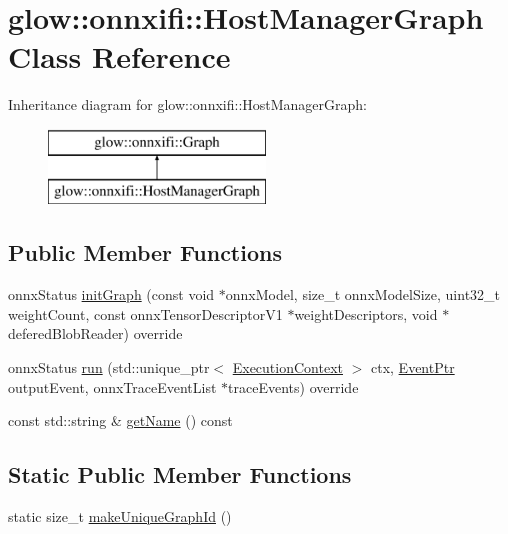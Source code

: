 \hypertarget{classglow_1_1onnxifi_1_1_host_manager_graph}{}\section{glow\+:\+:onnxifi\+:\+:Host\+Manager\+Graph Class Reference}
\label{classglow_1_1onnxifi_1_1_host_manager_graph}
Inheritance diagram for glow\+:\+:onnxifi\+:\+:Host\+Manager\+Graph\+:\begin{figure}[H]
\begin{center}
\leavevmode
\includegraphics[height=2.000000cm]{classglow_1_1onnxifi_1_1_host_manager_graph}
\end{center}
\end{figure}
\subsection*{Public Member Functions}
\begin{DoxyCompactItemize}
\item 
onnx\+Status \hyperlink{classglow_1_1onnxifi_1_1_host_manager_graph_a58234ef078e7db198825b214881fe7ef}{init\+Graph} (const void $\ast$onnx\+Model, size\+\_\+t onnx\+Model\+Size, uint32\+\_\+t weight\+Count, const onnx\+Tensor\+Descriptor\+V1 $\ast$weight\+Descriptors, void $\ast$defered\+Blob\+Reader) override
\item 
onnx\+Status \hyperlink{classglow_1_1onnxifi_1_1_host_manager_graph_a962669c45b8c354730f150ca64f1a6c0}{run} (std\+::unique\+\_\+ptr$<$ \hyperlink{classglow_1_1_execution_context}{Execution\+Context} $>$ ctx, \hyperlink{classglow_1_1onnxifi_1_1_event}{Event\+Ptr} output\+Event, onnx\+Trace\+Event\+List $\ast$trace\+Events) override
\item 
const std\+::string \& \hyperlink{classglow_1_1onnxifi_1_1_host_manager_graph_acd6bb7414badffcd5a82b57fd4b97149}{get\+Name} () const
\end{DoxyCompactItemize}
\subsection*{Static Public Member Functions}
\begin{DoxyCompactItemize}
\item 
static size\+\_\+t \hyperlink{classglow_1_1onnxifi_1_1_host_manager_graph_ada051c02bd3aa8b0b2cd109cc306893f}{make\+Unique\+Graph\+Id} ()
\end{DoxyCompactItemize}
